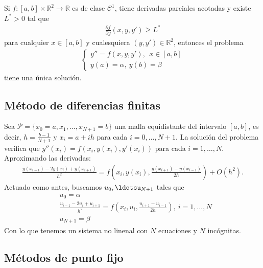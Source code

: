 \begin{teo}
Si $f: [a,b] \times \mathbb{R}^2 \longrightarrow \mathbb{R}$ es de clase $\mathscr{C}^1$, tiene derivadas parciales acotadas y existe $L^* > 0$ tal que
\begin{align*}
    \frac{\partial f}{\partial y}(x,y,y') \ge L^*
\end{align*}
para cualquier $x \in [a,b]$ y cualesquiera $(y,y') \in \mathbb{R}^2$, entonces el problema
\begin{align*}
        \left\{ \begin{array}{lcc}
             y'' = f(x,y,y'), \ \ x \in [a,b]\\
             y(a) = \alpha, \ y(b) = \beta
             \end{array}
   \right.
\end{align*}
tiene una única solución.
\end{teo}

\subsection{Método de diferencias finitas}

\noindent Sea $\mathcal{P} = \{ x_0 = a, x_1,\ldots,x_{N+1} = b\}$ una malla equidistante del intervalo $[a,b]$, es decir, $h = \frac{b-1}{N+1}$ y $x_i = a +ih$ para cada $i = 0,\ldots,N+1$. La solución del problema verifica que $y''(x_i) = f(x_i,y(x_i),y'(x_i))$ para cada $i = 1,\ldots,N$. Aproximando las derivadas:
\begin{align*}
    \frac{y(x_{i-1}) - 2y(x_i) +y(x_{i+1})}{h^2} = f\left(x_i,y(x_i), \frac{y(x_{i+1}) -y(x_{i-1})}{2h} \right) + O(h^2).
\end{align*}
Actuado como antes, buscamos $u_0,\ldotsu_{N+1}$ tales que
\begin{align*}
    &u_0 = \alpha \\
    & \frac{u_{i-1} - 2u_i + u_{i+1}}{h^2} = f\left(x_i, u_i, \frac{u_{i+1} -u_{i-1}}{2h} \right), \ i = 1,\ldots,N \\
    & u_{N+1} = \beta
\end{align*}
Con lo que tenemos un sistema no linenal con $N$ ecuaciones y $N$ incógnitas.

\subsection{Métodos de punto fijo}

